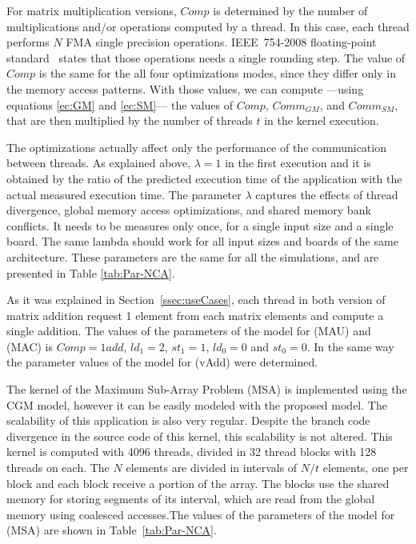For matrix multiplication versions, $Comp$ is determined by the number of multiplications and/or operations computed by a thread. In this case, each thread performs $N$ FMA single precision operations. IEEE~754-2008 floating-point standard~\citep{FMA-IEEE} states that those operations needs a single rounding step. The value of $Comp$ is the same for the all four optimizations modes, since they differ only in the memory access patterns. With those values, we can compute ---using equations \ref{ec:GM} and \ref{ec:SM}--- the values of $Comp$, $Comm_{GM}$, and $Comm_{SM}$, that are then multiplied by the number of threads $t$ in the kernel execution. 

The optimizations actually affect only the performance of the communication between threads. As explained above, $\lambda=1$ in the first execution and it is obtained by the ratio of the predicted execution time of the application with the actual measured execution time. The parameter $\lambda$ captures the effects of thread divergence, global memory access optimizations, and shared memory bank conflicts. It needs to be measures only once, for a single input size and a single board. The same lambda should work for all input sizes and boards of the same architecture. These parameters are the same for all the simulations, and are presented in Table \ref{tab:Par-NCA}.

As it was explained in Section~\ref{ssec:useCases}, each thread in both version of matrix addition request 1 element from each matrix elements and compute a single addition. The values of the parameters of the model for (MAU) and (MAC) is $Comp=1add$, $ld_1=2$, $st_1=1$, $ld_0=0$ and $st_0=0$. In the same way the parameter values of the model for (vAdd) were determined. 

The kernel of the Maximum Sub-Array Problem (MSA) is implemented using the CGM model, however it can be easily modeled with the proposed model. The scalability  of this application is also very regular. Despite the branch code divergence in the source code of this kernel, this scalability is not altered. This kernel is computed with 4096 threads, divided in 32 thread blocks with 128 threads on each. The $N$ elements are divided in intervals of $N/t$ elements, one per block and each block receive a portion of the array. The blocks use the shared memory for storing segments of its interval, which are read from the global memory using coalesced accesses.The values of the parameters of the model for (MSA) are shown in Table~\ref{tab:Par-NCA}.

